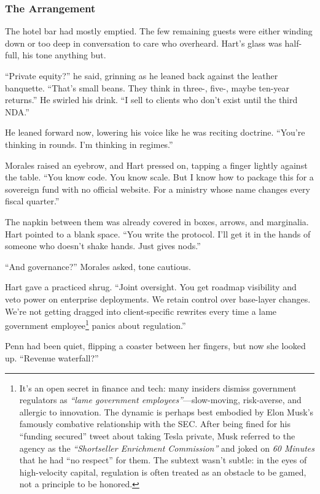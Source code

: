\medskip

\subsubsection{The Arrangement}

The hotel bar had mostly emptied. The few remaining guests were either winding down or too deep in conversation to 
care who overheard. Hart’s glass was half-full, his tone anything but.

“Private equity?” he said, grinning as he leaned back against the leather banquette. “That’s small beans. They think 
in three-, five-, maybe ten-year returns.” He swirled his drink. “I sell to clients who don’t exist until the 
third NDA.”

He leaned forward now, lowering his voice like he was reciting doctrine. “You’re thinking in rounds. 
I’m thinking in regimes.”

Morales raised an eyebrow, and Hart pressed on, tapping a finger lightly against the table. “You know code. 
You know scale. But I know how to package this for a sovereign fund with no official website. For a ministry whose name 
changes every fiscal quarter.”

The napkin between them was already covered in boxes, arrows, and marginalia. Hart pointed to a blank space. “You 
write the protocol. I’ll get it in the hands of someone who doesn’t shake hands. Just gives nods.”

“And governance?” Morales asked, tone cautious.

Hart gave a practiced shrug. “Joint oversight. You get roadmap visibility and veto power on enterprise deployments. 
We retain control over base-layer changes. We’re not getting dragged into client-specific rewrites every time a 
lame government employee\footnote{
It’s an open secret in finance and tech: many insiders dismiss government regulators as \emph{``lame government employees''}—slow-moving, risk-averse, and allergic to innovation. The dynamic is perhaps best embodied by Elon Musk’s famously combative relationship with the SEC. After being fined for his “funding secured” tweet about taking Tesla private, Musk referred to the agency as the \emph{“Shortseller Enrichment Commission”} and joked on \emph{60 Minutes} that he had “no respect” for them. The subtext wasn’t subtle: in the eyes of high-velocity capital, regulation is often treated as an obstacle to be gamed, not a principle to be honored.
}
panics about regulation.”

Penn had been quiet, flipping a coaster between her fingers, but now she looked up. “Revenue waterfall?”

